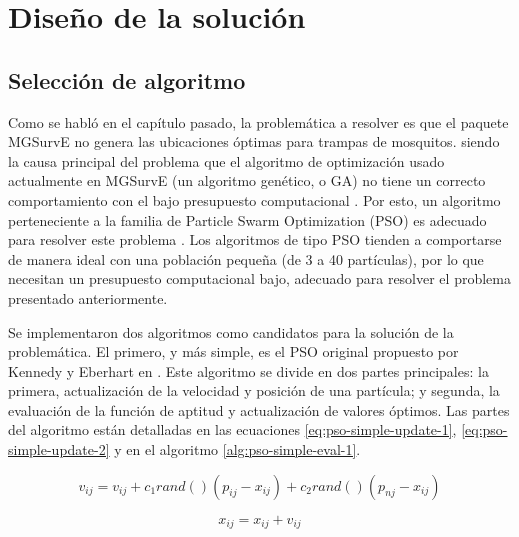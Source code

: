 \documentclass[letterpaper]{report}
\begin{document}
  \section{Diseño de la solución}
    \subsection{Selección de algoritmo}
    Como se habló en el capítulo pasado, la problemática a resolver es que el
    paquete MGSurvE no genera las ubicaciones óptimas para trampas de mosquitos.
    siendo la causa principal del
    problema que el algoritmo de optimización usado actualmente en MGSurvE
    (un algoritmo genético, o GA) no tiene un correcto comportamiento con el
    bajo presupuesto computacional \cite{SwarmVsEvol}. Por esto, un algoritmo
    perteneciente a
    la familia de Particle Swarm Optimization (PSO) es adecuado para resolver
    este problema \cite{SwarmVsEvol,PSOPopulationSize}. Los algoritmos de tipo
    PSO tienden a comportarse de manera ideal con una población pequeña (de 3
    a 40 partículas), por lo que necesitan un presupuesto computacional bajo,
    adecuado para resolver el problema presentado anteriormente.

    Se implementaron dos algoritmos como candidatos para la solución de la
    problemática. El primero, y más simple, es el PSO original propuesto
    por Kennedy y  Eberhart en \cite{PSODef}. Este algoritmo se divide en dos
    partes principales: la primera, actualización de la velocidad y posición de
    una partícula; y segunda, la evaluación de la función de aptitud y
    actualización de valores óptimos. Las partes del algoritmo están detalladas
    en las ecuaciones \ref{eq:pso-simple-update-1}, \ref{eq:pso-simple-update-2}
    y en el algoritmo \ref{alg:pso-simple-eval-1}.

    \begin{equation}
      v_{ij} = v_{ij} + c_1 rand()(p_{ij} - x_{ij}) + c_2 rand()(p_{nj}
        - x_{ij})
      \label{eq:pso-simple-update-1}
    \end{equation}

    \begin{equation}
      x_{ij} = x_{ij} + v_{ij}
      \label{eq:pso-simple-update-2}
    \end{equation}
\end{document}
